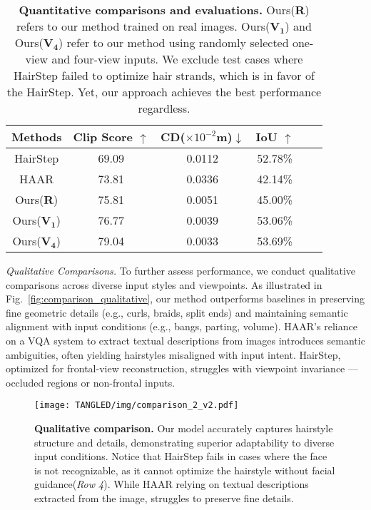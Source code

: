 \vspace{-4pt}
\begin{table}
  \small
  \caption{\textbf{Quantitative comparisons and evaluations.} Ours($\mathbf{R}$) refers to our method trained on real images. Ours($\mathbf{V_1}$) and Ours($\mathbf{V_4}$) refer to our method using randomly selected one-view and four-view inputs. We exclude test cases where HairStep failed to optimize hair strands, which is in favor of the HairStep. Yet, our approach achieves the best performance regardless.}
  \label{tab:comparison-quantitative}
    \begin{tabular}{cccccc}
    \toprule
    Methods        & Clip Score $\uparrow$ & CD($\times10^{-2}$m)$\downarrow$ & IoU $\uparrow$ \\
    \toprule
    HairStep     &  69.09   &  0.0112   &  52.78\%  \\
    HAAR     &  73.81   &  0.0336   &  42.14\%   \\
    \midrule
    Ours($\mathbf{R}$)        &  75.81   &  0.0051   &  45.00\% \\
    \midrule
    Ours($\mathbf{V_1}$)   &  76.77   &  0.0039   &  53.06\% \\
    Ours($\mathbf{V_4}$)        &  79.04   &  0.0033   &  53.69\% \\
    \bottomrule
    \end{tabular}
\end{table}





\vspace{4pt}
\noindent \textit{Qualitative Comparisons.}
\label{sec:qualitative_comp}
To further assess performance, we conduct qualitative comparisons across diverse input styles and viewpoints. As illustrated in Fig.~\ref{fig:comparison_qualitative}, our method outperforms baselines in preserving fine geometric details (e.g., curls, braids, split ends) and maintaining semantic alignment with input conditions (e.g., bangs, parting, volume).
HAAR’s reliance on a VQA system to extract textual descriptions from images introduces semantic ambiguities, often yielding hairstyles misaligned with input intent. HairStep, optimized for frontal-view reconstruction, struggles with viewpoint invariance — occluded regions or non-frontal inputs.


\begin{figure}[thbp]
  \texttt{[image: TANGLED/img/comparison\_2\_v2.pdf]}
  \caption{\textbf{Qualitative comparison.} Our model accurately captures hairstyle structure and details, demonstrating superior adaptability to diverse input conditions. Notice that HairStep fails in cases where the face is not recognizable, as it cannot optimize the hairstyle without facial guidance(\textit{Row 4}). While HAAR relying on textual descriptions extracted from the image, struggles to preserve fine details.}
  \label{fig:comparison_qualitative2}
\end{figure}


